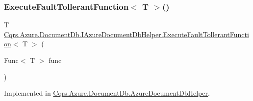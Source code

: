 \subsubsection{\texorpdfstring{Execute\+Fault\+Tollerant\+Function$<$ T $>$()}{ExecuteFaultTollerantFunction< T >()}}
{\footnotesize\ttfamily T \hyperlink{interfaceCqrs_1_1Azure_1_1DocumentDb_1_1IAzureDocumentDbHelper_af0a2c96f00154420faa7c528d5bf55bb}{Cqrs.\+Azure.\+Document\+Db.\+I\+Azure\+Document\+Db\+Helper.\+Execute\+Fault\+Tollerant\+Function}$<$ T $>$ (\begin{DoxyParamCaption}\item[{Func$<$ T $>$}]{func }\end{DoxyParamCaption})}



Implemented in \hyperlink{classCqrs_1_1Azure_1_1DocumentDb_1_1AzureDocumentDbHelper_a470fcc86befa4a28725ad53e715a223c}{Cqrs.\+Azure.\+Document\+Db.\+Azure\+Document\+Db\+Helper}.

